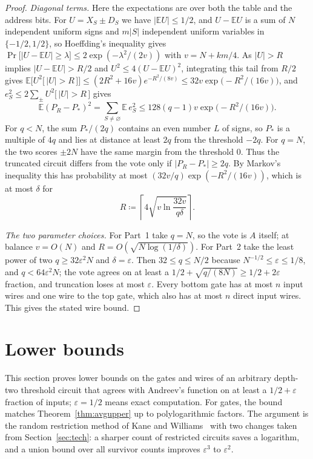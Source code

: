 \documentclass[11pt,letterpaper]{article}
\theoremstyle{remark}
\newcommand{\ind}[1]{\bigl[\,#1\,\bigr]}
\newcommand{\sect}[1]{\section{\texorpdfstring{\color{ink}#1}{#1}}}
\begin{document}
\begin{proof}
\emph{Diagonal terms.}
Here the expectations are over both the table and the address bits.
For $U=X_S\pm D_S$ we have $|\mathbb EU|\le1/2$, and $U-\mathbb EU$ is a sum
of $N$ independent uniform signs and $m|S|$ independent uniform
variables in $\{-1/2,1/2\}$, so Hoeffding's inequality
gives $\Pr\bigl[|U-\mathbb EU|\ge\lambda\bigr]\le2\exp(-\lambda^2/(2v))$ with
$v=N+km/4$. As $|U|>R$ implies $|U-\mathbb EU|>R/2$ and
$U^2\le4(U-\mathbb EU)^2$, integrating this tail from $R/2$ gives
$\mathbb E\bigl[U^2\ind{|U|>R}\bigr]\le(2R^2+16v)e^{-R^2/(8v)}
\le32v\exp\bigl(-R^2/(16v)\bigr)$, and $e_S^2\le2\sum_\pm U^2\ind{|U|>R}$
gives
\[
\mathbb E(P_R-P_*)^2=\sum_{S\ne\varnothing}\mathbb E\,e_S^2
\le128(q-1)v\exp\bigl(-R^2/(16v)\bigr).
\]
For $q<N$, the sum $P_*/(2q)$ contains an even number $L$ of signs, so
$P_*$ is a multiple of $4q$ and lies at distance at least $2q$ from the
threshold $-2q$. For $q=N$, the two scores $\pm2N$ have the same margin
from the threshold $0$. Thus the truncated circuit
differs from the vote only if $|P_R-P_*|\ge2q$. By Markov's inequality this
has probability at most $(32v/q)\exp(-R^2/(16v))$, which is at most $\delta$
for
\[
R\coloneqq\left\lceil4\sqrt{v\ln\frac{32v}{q\delta}}\right\rceil .
\]

\emph{The two parameter choices.}
For Part~1 take $q=N$, so the vote is $A$ itself; at balance $v=O(N)$ and
$R=O(\sqrt{N\log(1/\delta)})$. For Part~2 take the least power of two
$q\ge32\varepsilon^2N$ and $\delta=\varepsilon$. Then $32\le q\le N/2$
because $N^{-1/2}\le\varepsilon\le1/8$, and $q<64\varepsilon^2N$; the vote
agrees on at least a $1/2+\sqrt{q/(8N)}\ge1/2+2\varepsilon$ fraction, and
truncation loses at most $\varepsilon$. Every bottom gate has at most $n$
input wires and one wire to the top
gate, which also has at most $n$ direct input wires. This gives the stated
wire bound.
\end{proof}


\sect{Lower bounds}\label{sec:lower}

This section proves lower bounds on the gates and wires of an arbitrary
depth-two threshold circuit that agrees with Andreev's function on at least a
$1/2+\varepsilon$ fraction of inputs; $\varepsilon=1/2$ means exact computation.
For gates, the bound matches Theorem~\ref{thm:avgupper} up to
polylogarithmic factors. The argument is the random restriction method of
Kane and Williams~\cite{KW} with two changes taken from
Section~\ref{sec:tech}: a sharper count of restricted circuits saves a
logarithm, and a union bound over all survivor counts improves
$\varepsilon^3$ to $\varepsilon^2$.
\end{document}
